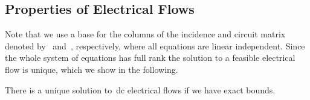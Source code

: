 \subsection{Properties of Electrical Flows}%
\label{ch:network-analyzes:sec:mathematical-model:properties-elec-flows}%
% 
Note that we use a base for the columns of the incidence and circuit matrix
denoted by~ and~,
respectively, where all equations are linear independent. Since the whole system
of equations has full rank the solution to a feasible electrical flow is unique,
which we show in the following.
%
\begin{lemma}
    There is a unique solution to~\gls{dc} electrical flows if we have exact
    bounds.
    \label{ch:network-analyzes:sec:mathematical-model:lem:unique-flow}
\end{lemma}
% 
